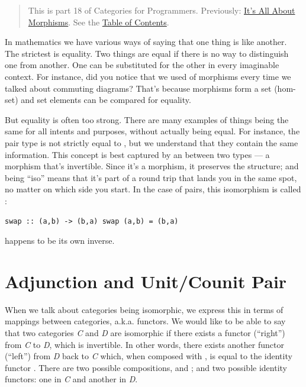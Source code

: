 \begin{quote}
This is part 18 of Categories for Programmers. Previously:
\href{https://bartoszmilewski.com/2015/11/17/its-all-about-morphisms/}{It's
All About Morphisms}. See the
\href{https://bartoszmilewski.com/2014/10/28/category-theory-for-programmers-the-preface/}{Table
of Contents}.
\end{quote}

In mathematics we have various ways of saying that one thing is like
another. The strictest is equality. Two things are equal if there is no
way to distinguish one from another. One can be substituted for the
other in every imaginable context. For instance, did you notice that we
used  of morphisms every time we talked about commuting
diagrams? That's because morphisms form a set (hom-set) and set elements
can be compared for equality.

But equality is often too strong. There are many examples of things
being the same for all intents and purposes, without actually being
equal. For instance, the pair type  is not
strictly equal to , but we understand that they
contain the same information. This concept is best captured by an
 between two types --- a morphism that's invertible.
Since it's a morphism, it preserves the structure; and being ``iso''
means that it's part of a round trip that lands you in the same spot, no
matter on which side you start. In the case of pairs, this isomorphism
is called :

\begin{verbatim}
swap :: (a,b) -> (b,a) swap (a,b) = (b,a)
\end{verbatim}

 happens to be its own inverse.

\section{Adjunction and Unit/Counit
Pair}\label{adjunction-and-unitcounit-pair}

When we talk about categories being isomorphic, we express this in terms
of mappings between categories, a.k.a. functors. We would like to be
able to say that two categories \emph{C} and \emph{D} are isomorphic if
there exists a functor  (``right'') from \emph{C} to \emph{D},
which is invertible. In other words, there exists another functor
 (``left'') from \emph{D} back to \emph{C} which, when
composed with , is equal to the identity functor .
There are two possible compositions,  and
; and two possible identity functors: one in \emph{C}
and another in \emph{D}.

